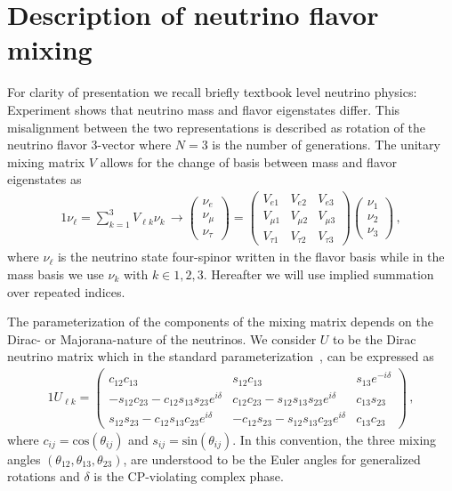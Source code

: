 \documentclass[addchapnum]{ws-rv961x669} %
\begin{document}
\section{Description of neutrino flavor mixing}
\label{sec:numass}
For clarity of presentation we recall briefly textbook level neutrino physics: Experiment shows that neutrino mass and flavor eigenstates differ. This misalignment between the two representations is described as rotation of the neutrino flavor 3-vector where $N=3$ is the number of generations. The unitary mixing matrix $V$ allows for the change of basis between mass and flavor eigenstates as 
\begin{alignat}{1}
	\label{basis:1} \nu_{\ell}=\sum_{k=1}^{3}V_{\ell k}\nu_{k}\,\rightarrow
	\begin{pmatrix}
		\nu_{e}\\
		\nu_{\mu}\\
		\nu_{\tau}
	\end{pmatrix}=
	\begin{pmatrix}
		V_{e1} & V_{e2} & V_{e3}\\
		V_{\mu1} & V_{\mu2} & V_{\mu3}\\
		V_{\tau1} & V_{\tau2} & V_{\tau3}
	\end{pmatrix}
	\begin{pmatrix}
		\nu_{1}\\
		\nu_{2}\\
		\nu_{3}
	\end{pmatrix}\,,
\end{alignat}
where $\nu_{\ell}$ is the neutrino state four-spinor written in the flavor basis while in the mass basis we use $\nu_{k}$ with $k\in1,2,3$. Hereafter we will use implied summation  over repeated indices.

The parameterization of the components of the mixing matrix depends on the Dirac- or Majorana-nature of the neutrinos. We consider $U$ to be the Dirac neutrino matrix which in the standard parameterization~\citep{Schwartz:2014sze}, can be expressed as
\begin{alignat}{1}
	\label{rotation:1} U_{\ell k} =
	  \begin{pmatrix}
		  c_{12}c_{13} & s_{12}c_{13} & s_{13}e^{-i\delta}\\
		  -s_{12}c_{23} - c_{12}s_{13}s_{23}e^{i\delta} & c_{12}c_{23} - s_{12}s_{13}s_{23}e^{i\delta} & c_{13}s_{23}\\
		  s_{12}s_{23} - c_{12}s_{13}c_{23}e^{i\delta}& -c_{12}s_{23} - s_{12}s_{13}c_{23}e^{i\delta} & c_{13}c_{23}
	  \end{pmatrix}\,,
\end{alignat}
where $c_{ij} = \mathrm{cos}(\theta_{ij})$ and $s_{ij} = \mathrm{sin}(\theta_{ij})$. In this convention, the three mixing angles $(\theta_{12}, \theta_{13}, \theta_{23})$, are understood to be the Euler angles for generalized rotations and $\delta$ is the CP-violating complex phase. 
\end{document}
